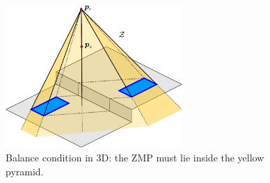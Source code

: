 


\begin{figure}
    \centering
    \includegraphics[width=0.6\textwidth]{figures/balance3d.pdf}
    \caption{Balance condition in 3D: the ZMP must lie inside the yellow pyramid.}
    \label{fig:WoS:balance3d}
\end{figure}

